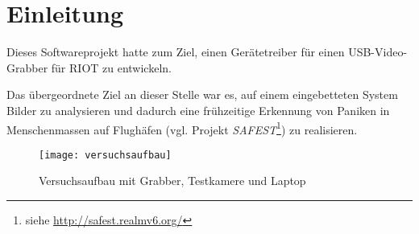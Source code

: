 \section{Einleitung}
Dieses Softwareprojekt hatte zum Ziel, einen Gerätetreiber für einen USB-Video-Grabber für RIOT zu entwickeln.

Das übergeordnete Ziel an dieser Stelle war es, auf einem eingebetteten System Bilder zu analysieren und dadurch eine frühzeitige  Erkennung von Paniken in Menschenmassen auf Flughäfen (vgl. Projekt \emph{SAFEST}\footnote{siehe \url{http://safest.realmv6.org/}}) zu realisieren.

\begin{figure}[ht]
    \centering
    \texttt{[image: versuchsaufbau]}
    \caption{Versuchsaufbau mit Grabber, Testkamere und Laptop}
\end{figure}

